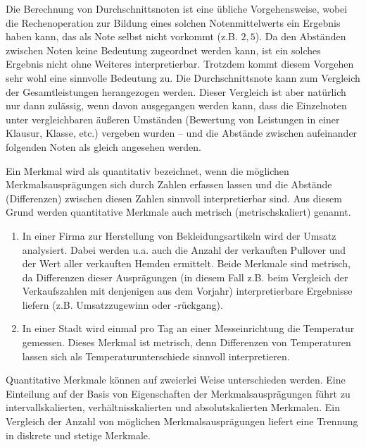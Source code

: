 \documentclass{lecture}
\begin{document}
    \begin{example}
        Die Berechnung von Durchschnittsnoten ist eine übliche Vorgehensweise, wobei die Rechenoperation zur Bildung eines solchen Notenmittelwerts ein Ergebnis haben kann, das als Note selbst nicht vorkommt (z.B. \(2,5\)).
        Da den Abständen zwischen Noten keine Bedeutung zugeordnet werden kann, ist ein solches Ergebnis nicht ohne Weiteres interpretierbar.
        Trotzdem kommt diesem Vorgehen sehr wohl eine sinnvolle Bedeutung zu.
        Die Durchschnittsnote kann zum Vergleich der Gesamtleistungen herangezogen werden.
        Dieser Vergleich ist aber natürlich nur dann zulässig, wenn davon ausgegangen werden kann, dass die Einzelnoten unter vergleichbaren äußeren Umständen (Bewertung von Leistungen in einer Klausur, Klasse, etc.) vergeben wurden -- und die Abstände zwischen aufeinander folgenden Noten als gleich angesehen werden.
    \end{example}

    Ein Merkmal wird als quantitativ bezeichnet, wenn die möglichen Merkmalsausprägungen sich durch Zahlen erfassen lassen und die Abstände (Differenzen) zwischen diesen Zahlen sinnvoll interpretierbar sind.
    Aus diesem Grund werden quantitative Merkmale auch metrisch (metrischskaliert) genannt.

    \begin{example}
        \begin{enumerate}
            \item In einer Firma zur Herstellung von Bekleidungsartikeln wird der Umsatz analysiert.
            Dabei werden u.a. auch die Anzahl der verkauften Pullover und der Wert aller verkauften Hemden ermittelt.
            Beide Merkmale sind metrisch, da Differenzen dieser Ausprägungen (in diesem Fall z.B. beim Vergleich der Verkaufszahlen mit denjenigen aus dem Vorjahr) interpretierbare Ergebnisse liefern (z.B. Umsatzzugewinn oder -rückgang).
            \item In einer Stadt wird einmal pro Tag an einer Messeinrichtung die Temperatur gemessen.
            Dieses Merkmal ist metrisch, denn Differenzen von Temperaturen lassen sich als Temperaturunterschiede sinnvoll interpretieren.
        \end{enumerate}
    \end{example}

    Quantitative Merkmale können auf zweierlei Weise unterschieden werden.
    Eine Einteilung auf der Basis von Eigenschaften der Merkmalsausprägungen führt zu intervallskalierten, verhältnisskalierten und absolutskalierten Merkmalen.
    Ein Vergleich der Anzahl von möglichen Merkmalsausprägungen liefert eine Trennung in diskrete und stetige Merkmale.
\end{document}
